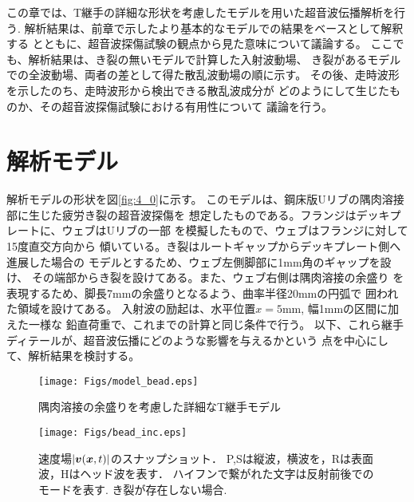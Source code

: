 この章では、T継手の詳細な形状を考慮したモデルを用いた超音波伝播解析を行う.
解析結果は、前章で示したより基本的なモデルでの結果をベースとして解釈する
とともに、超音波探傷試験の観点から見た意味について議論する。
ここでも、解析結果は、き裂の無いモデルで計算した入射波動場、
き裂があるモデルでの全波動場、両者の差として得た散乱波動場の順に示す。
その後、走時波形を示したのち、走時波形から検出できる散乱波成分が
どのようにして生じたものか、その超音波探傷試験における有用性について
議論を行う。
\section{解析モデル}
解析モデルの形状を図\ref{fig:4_0}に示す。
このモデルは、鋼床版Uリブの隅肉溶接部に生じた疲労き裂の超音波探傷を
想定したものである。フランジはデッキプレートに、ウェブはUリブの一部
を模擬したもので、ウェブはフランジに対して15度直交方向から
傾いている。き裂はルートギャップからデッキプレート側へ進展した場合の
モデルとするため、ウェブ左側脚部に1mm角のギャップを設け、
その端部からき裂を設けてある。また、ウェブ右側は隅肉溶接の余盛り
を表現するため、脚長7mmの余盛りとなるよう、曲率半径20mmの円弧で
囲われた領域を設けてある。
入射波の励起は、水平位置$x=5$mm, 幅1mmの区間に加えた一様な
鉛直荷重で、これまでの計算と同じ条件で行う。
以下、これら継手ディテールが、超音波伝播にどのような影響を与えるかという
点を中心にして、解析結果を検討する。
\begin{figure}[h]
	\begin{center}
	\texttt{[image: Figs/model\_bead.eps]} 
	\end{center}
	\caption{
		隅肉溶接の余盛りを考慮した詳細なT継手モデル
	} 
	\label{fig:fig4_0}
\end{figure}
\begin{figure}[h]
	\begin{center}
	\texttt{[image: Figs/bead\_inc.eps]} 
	\end{center}
	\caption{
		速度場$|\mbox{\boldmath $v$}(\mbox{\boldmath $x$},t)|$のスナップショット．
		P,Sは縦波，横波を，Rは表面波，Hはヘッド波を表す．
		ハイフンで繋がれた文字は反射前後でのモードを表す. き裂が存在しない場合.
	} 
	\label{fig:fig4_1}
\end{figure}
